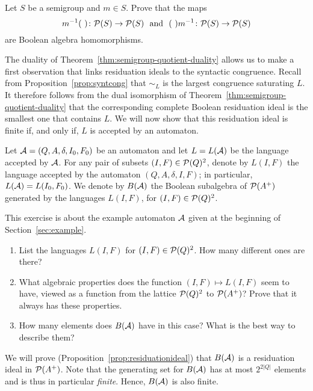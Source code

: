 \begin{exercise}\easy \label{exe:quot-hom}
Let $S$ be a semigroup and $m\in S$. Prove that the maps 
\[
m^{-1}(\ )\colon \mathcal{P}(S)\to \mathcal{P}(S)\ \text{ and }\ (\ )m^{-1}\colon \mathcal{P}(S)\to \mathcal{P}(S)
\]
 are Boolean algebra homomorphisms.  
\end{exercise}

The duality of Theorem~\ref{thm:semigroup-quotient-duality} allows us to make a first observation that links residuation ideals to the syntactic congruence. 
Recall from Proposition~\ref{prop:syntcong} that $\sim_L$ is the largest congruence saturating $L$. It therefore follows from the dual isomorphism of Theorem~\ref{thm:semigroup-quotient-duality} that the corresponding complete Boolean residuation ideal is the smallest one that contains $L$. We will now show that this residuation ideal is finite if, and only if, $L$ is accepted by an automaton.

\begin{definition}
 Let $\mathcal{A} = (Q, A, \delta, I_0, F_0)$ be an automaton and let $L = L(\mathcal{A})$ be the language accepted by $\mathcal{A}$. For any pair of subsets $(I, F) \in \mathcal{P}(Q)^2$, denote by $L(I,F)$ the language accepted by the automaton $(Q, A, \delta, I, F)$; in particular, $L(\mathcal{A}) = L(I_0, F_0)$. We denote by $B(\mathcal{A})$ the Boolean subalgebra of $\mathcal{P}(A^+)$ generated by the languages $L(I,F)$, for $(I,F) \in \mathcal{P}(Q)^2$.
\end{definition}
\begin{exercise}\label{exe:exactd}
  This exercise is about the example automaton $\mathcal{A}$ given at the beginning of Section~\ref{sec:example}.
  \begin{enumerate}
  \item \easy List the languages $L(I,F)$ for $(I,F) \in \mathcal{P}(Q)^2$. How many different ones are there?
  \item \medium What algebraic properties does the function $(I,F) \mapsto L(I,F)$ seem to have, viewed as a function from the lattice $\mathcal{P}(Q)^2$ to $\mathcal{P}(A^+)$? Prove that it always has these properties.
  \item \medium How many elements does $B(\mathcal{A})$ have in this case? What is the best way to describe them?
  \end{enumerate}
\end{exercise}

We will prove (Proposition~\ref{prop:residuationideal}) that $B(\mathcal{A})$ is a residuation ideal in $\mathcal{P}(A^+)$. Note that the generating set for $B(\mathcal{A})$ has at most $2^{2|Q|}$ elements and is thus in particular \emph{finite}.  Hence, $B(\mathcal{A})$ is also finite. 
%

